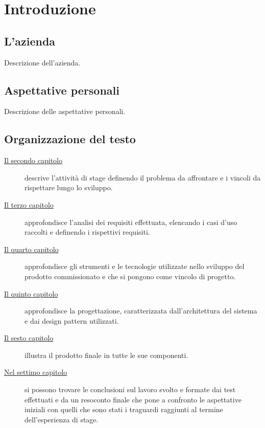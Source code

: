 \chapter{Introduzione}
\label{cap:introduzione}

\section{L'azienda}

Descrizione dell'azienda.

\section{Aspettative personali}

Descrizione delle aspettative personali.

\section{Organizzazione del testo}

\begin{description}
    \item[{\hyperref[cap:descrizione-stage]{Il secondo capitolo}}] descrive l'attività di stage definendo il problema da affrontare e i vincoli da rispettare lungo lo sviluppo.
    
    \item[{\hyperref[cap:analisi-requisiti]{Il terzo capitolo}}] approfondisce l'analisi dei requisiti effettuata, elencando i casi d'uso raccolti e definendo i rispettivi requisiti.
    
    \item[{\hyperref[cap:strumenti-utilizzati]{Il quarto capitolo}}] approfondisce gli strumenti e le tecnologie utilizzate nello sviluppo del prodotto commissionato e che si pongono come vincolo di progetto.
    
    \item[{\hyperref[cap:progettazione]{Il quinto capitolo}}] approfondisce la progettazione, caratterizzata dall'architettura del sistema e dai design pattern utilizzati.
    
    \item[{\hyperref[cap:prodotto-finale]{Il sesto capitolo}}] illustra il prodotto finale in tutte le sue componenti.
    
    \item[{\hyperref[cap:conclusioni]{Nel settimo capitolo}}] si possono trovare le conclusioni sul lavoro svolto e formate dai test effettuati e da un resoconto finale che pone a confronto le aspettative iniziali con quelli che sono stati i traguardi raggiunti al termine dell'esperienza di stage.
\end{description}

